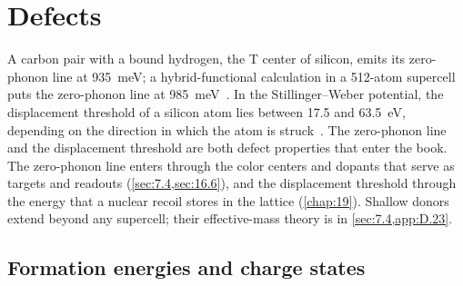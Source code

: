 \section{Defects}\label{app:E.10}

A carbon pair with a bound hydrogen, the T center of silicon, emits its zero-phonon line at \SI{935}{meV}; a hybrid-functional calculation in a 512-atom supercell puts the zero-phonon line at \SI{985}{meV}~\cite{dhaliah2022first}. In the Stillinger--Weber potential, the displacement threshold of a silicon atom lies between 17.5 and \SI{63.5}{eV}, depending on the direction in which the atom is struck~\cite{kadribasic2018directional}. The zero-phonon line and the displacement threshold are both defect properties that enter the book. The zero-phonon line enters through the color centers and dopants that serve as targets and readouts (\cref{sec:7.4,sec:16.6}), and the displacement threshold through the energy that a nuclear recoil stores in the lattice (\cref{chap:19}). Shallow donors extend beyond any supercell; their effective-mass theory is in \cref{sec:7.4,app:D.23}.

\subsection{Formation energies and charge states}

